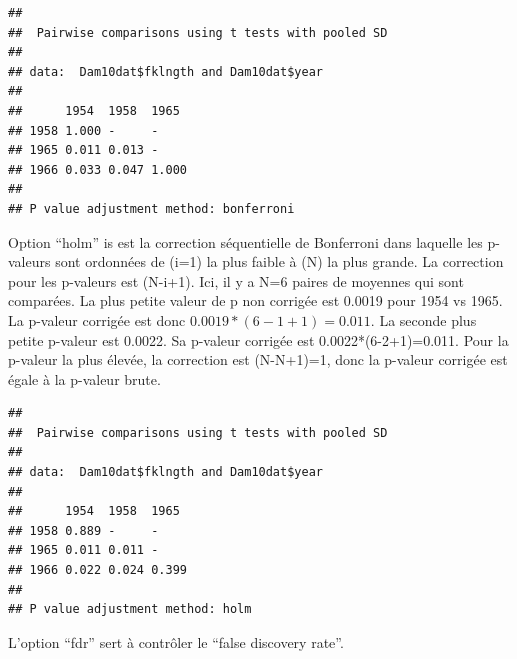 \documentclass[12pt,]{book}
\newenvironment{Shaded}{\begin{snugshade}}{\end{snugshade}}
\newcommand{\DataTypeTok}[1]{\textcolor[rgb]{0.27,0.27,0.27}{#1}}
\newcommand{\KeywordTok}[1]{\textcolor[rgb]{0.27,0.27,0.27}{\textbf{#1}}}
\newcommand{\NormalTok}[1]{#1}
\newcommand{\OperatorTok}[1]{\textcolor[rgb]{0.43,0.43,0.43}{\textbf{#1}}}
\newcommand{\StringTok}[1]{\textcolor[rgb]{0.5,0.5,0.5}{#1}}
\begin{document}
\begin{Shaded}
\end{Shaded}

\begin{verbatim}
## 
## 	Pairwise comparisons using t tests with pooled SD 
## 
## data:  Dam10dat$fklngth and Dam10dat$year 
## 
##      1954  1958  1965 
## 1958 1.000 -     -    
## 1965 0.011 0.013 -    
## 1966 0.033 0.047 1.000
## 
## P value adjustment method: bonferroni
\end{verbatim}

Option ``holm'' is est la correction séquentielle de Bonferroni dans laquelle les p-valeurs sont ordonnées de (i=1) la plus faible à (N) la plus grande. La correction pour les p-valeurs est (N-i+1). Ici, il y a N=6 paires de moyennes qui sont comparées. La plus petite valeur de p non corrigée est 0.0019 pour 1954 vs 1965. La p-valeur corrigée est donc \(0.0019*(6-1+1)=0.011\). La seconde plus petite p-valeur est 0.0022. Sa p-valeur corrigée est 0.0022*(6-2+1)=0.011. Pour la p-valeur la plus élevée, la correction est (N-N+1)=1, donc la p-valeur corrigée est égale à la p-valeur brute.

\begin{Shaded}
\end{Shaded}

\begin{verbatim}
## 
## 	Pairwise comparisons using t tests with pooled SD 
## 
## data:  Dam10dat$fklngth and Dam10dat$year 
## 
##      1954  1958  1965 
## 1958 0.889 -     -    
## 1965 0.011 0.011 -    
## 1966 0.022 0.024 0.399
## 
## P value adjustment method: holm
\end{verbatim}

L'option ``fdr'' sert à contrôler le ``false discovery rate''.

\begin{Shaded}
\end{Shaded}
\end{document}
